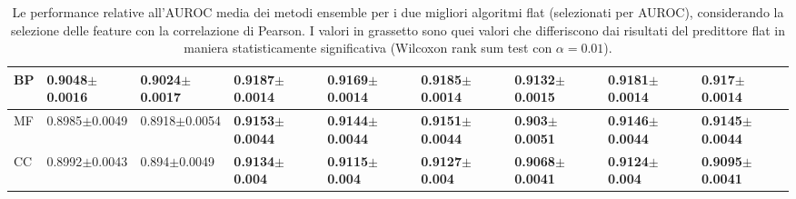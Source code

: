 \documentclass[12pt]{report}
\begin{document}
\begin{table}[h!]
{\begin{subtable}[t]{0.4\textwidth}
\begin{tabular}{|l|l|l|l|l|l|l|l|l|}
BP&\footnotesize{0.9048$\pm$0.0016}&\footnotesize{0.9024$\pm$0.0017}& \textbf{\footnotesize{0.9187$\pm$0.0014}} & \textbf{\footnotesize{0.9169$\pm$0.0014}} & \textbf{\footnotesize{0.9185$\pm$0.0014}} & \textbf{\footnotesize{0.9132$\pm$0.0015}} & \textbf{\footnotesize{0.9181$\pm$0.0014}} & \textbf{\footnotesize{0.917$\pm$0.0014}} \\ \hline
MF&\footnotesize{0.8985$\pm$0.0049}&\footnotesize{0.8918$\pm$0.0054}& \textbf{\footnotesize{0.9153$\pm$0.0044}} & \textbf{\footnotesize{0.9144$\pm$0.0044}} & \textbf{\footnotesize{0.9151$\pm$0.0044}} & \textbf{\footnotesize{0.903$\pm$0.0051}} & \textbf{\footnotesize{0.9146$\pm$0.0044}} & \textbf{\footnotesize{0.9145$\pm$0.0044}} \\ \hline
CC&\footnotesize{0.8992$\pm$0.0043}&\footnotesize{0.894$\pm$0.0049}& \textbf{\footnotesize{0.9134$\pm$0.004}} & \textbf{\footnotesize{0.9115$\pm$0.004}} & \textbf{\footnotesize{0.9127$\pm$0.004}} & \textbf{\footnotesize{0.9068$\pm$0.0041}} & \textbf{\footnotesize{0.9124$\pm$0.004}} & \textbf{\footnotesize{0.9095$\pm$0.0041}} \\ \hline\end{tabular}
                    \label{table1}
                    \end{subtable}}
\caption{\footnotesize{Le performance relative all'AUROC media dei metodi ensemble per i due migliori algoritmi flat (selezionati per AUROC), considerando la selezione delle feature con la correlazione di Pearson. I valori in grassetto sono quei valori che differiscono dai risultati del predittore flat in maniera statisticamente significativa (Wilcoxon rank sum test con $\alpha = 0.01$).}}
\label{best_auroc_fs}
\end{table}
\end{document}
